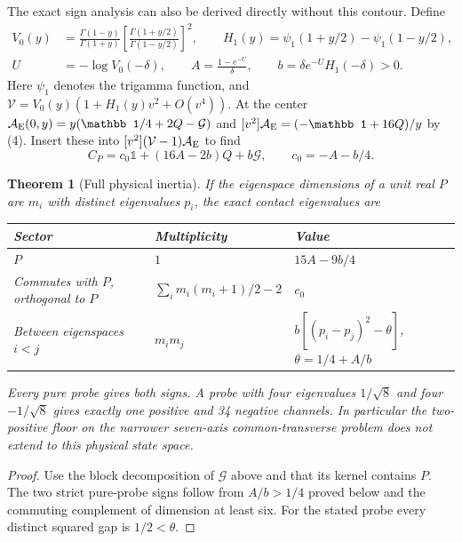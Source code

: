 \documentclass[11pt]{article}
\newtheorem{theorem}{Theorem}
\newcommand{\I}{\mathbb 1}
\newcommand{\cA}{\mathcal A}
\begin{document}
The exact sign analysis can also be derived directly without this
contour. Define
\begin{equation}
 \begin{split}
 V_0(y)&=\frac{\Gamma(1-y)}{\Gamma(1+y)}
       \left[\frac{\Gamma(1+y/2)}{\Gamma(1-y/2)}\right]^2,\qquad
 H_1(y)=\psi_1(1+y/2)-\psi_1(1-y/2),\\
 U&=-\log V_0(-\delta),\qquad
 A=\frac{1-e^{-U}}{\delta},\qquad b=\delta e^{-U} H_1(-\delta)>0 .
 \end{split}
 \label{eq:Ab}
\end{equation}
Here $\psi_1$ denotes the trigamma function, and
$\mathcal V=V_0(y)(1+H_1(y)v^2+O(v^4))$.
At the center $\cA_{\rm E}(0,y)=y(\I/4+2Q-\mathcal G)$ and
$[v^2]\cA_{\rm E}=(-\I+16Q)/y$ by (4).
Insert these into $[v^2](\mathcal V-1)\cA_{\rm E}$ to find
\begin{equation}
 C_P=c_0\I+(16A-2b)Q+b\mathcal G,\qquad c_0=-A-b/4 .
 \label{eq:contact}
\end{equation}

\begin{theorem}[Full physical inertia]
If the eigenspace dimensions of a unit real $P$ are $m_i$ with
distinct eigenvalues $p_i$, the exact contact eigenvalues are
\begin{center}
\begin{tabular}{lll}
\toprule
Sector & Multiplicity & Value\\
\midrule
$P$ & $1$ & $15A-9b/4$\\
Commutes with $P$, orthogonal to $P$ &
 $\sum_i m_i(m_i+1)/2-2$ & $c_0$\\
Between eigenspaces $i<j$ & $m_i m_j$ &
 $b[(p_i-p_j)^2-\theta]$, \ $\theta=1/4+A/b$\\
\bottomrule
\end{tabular}
\end{center}
Every pure probe gives both signs. A probe with four eigenvalues
$1/\sqrt8$ and four $-1/\sqrt8$ gives exactly one positive and 34 negative
channels. In particular the two-positive floor on the narrower
seven-axis common-transverse problem does not extend to this
physical state space.
\end{theorem}
\begin{proof}
Use the block decomposition of $\mathcal G$ above and that its kernel
contains $P$. The two strict pure-probe signs follow from $A/b>1/4$
proved below and the commuting complement of dimension at least six.
For the stated probe every distinct squared gap is $1/2<\theta$.
\end{proof}
\end{document}
